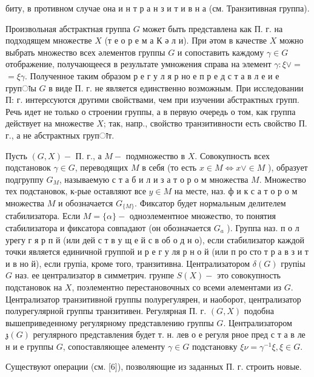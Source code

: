 \documentclass[10pt]{article}
\begin{document}
биту, в противном случае она и н т р а н з и т и в н а (см. Транзитивная группа).



Произвольная абстрактная группа $G$ может быть представлена как П. г. на подходящем множестве $X$ (т е о р е м а $К$ ә л и). При әтом в качестве $X$ можно выбрать множество всех әлементов группы $G$ и сопоставить каждому $\gamma \in G$ отображение, получающееся в результате умножения справа на элемент $\gamma: \xi \vee=$ $=\xi \gamma$. Полученное таким образом р е г у л я р но е п р е д с т а в л е и е групाы $G$ в виде П. г. не является единственно возможным. При исследовании П: г. интерєсуются другими свойствами, чем при изучении абстрактных групп. Речь идет не только о строении группы, а в первую очередь о том, как группа действует на множестве $X$; так, напр., свойство транзитивности есть свойство П. г., а не абстрактных групाт.



Пусть $(G, X)-$ П. г., а $M-$ подмножество в $X$. Совокупность всех подстановок $\gamma \in G$, переводящих $M$ в себя (то есть $x \in M \Leftrightarrow x \vee \in M$ ), образует подгруппу $G_{M}$, называемую с т а б и л и з а т о р о м множества $M$. Множество тех подстановок, к-рые оставляют все $y \in M$ на месте, наз. ф и к с а т о р о м множества $M$ и обозначается $G_{\{M\}}$. Фиксатор будет нормальным делителем стабилизатора. Если $M=\{\alpha\}-$ одноэлементное множество, то понятия стабилизатора и фиксатора совпадают (он обозначается $G_{a}$ ). Группа наз. п о л урегу г я р п й (или дей с т в у щ е й с в об о д н о), если стабилизатор каждой точки является единичной группой и р е г у ля р н о й (или п ро сто т р а в з и т и в но й), если групіа, кроме того, транзитивна. Централизатором $\delta(G)$ групіы $G$ наз. ее централизатор в симметрич. грунпе $S(X)-$ это совокупность подстановок на $X$, поэлементно перестановочных со всеми әлементами из $G$. Централизатор транзитивной группы полурегулярен, и наоборот, централизатор полурегулярной группы транзитивен. Регулярная П. г. $(G, X)$ подобна вышеприведенному регулярному представлению группы $G$. Централизатором $\mathfrak{z}(G)$ регулярного представления будет т. н. лев о е регуля рное пред с т а в ле н и е группы $G$, сопоставляющее әлементу $\gamma \in G$ подстановку $\xi \nu=\gamma^{-1} \xi, \xi \in G$.



Существуют операции (см. [6]), позволяющие из заданных П. г. строить новые.
\end{document}
